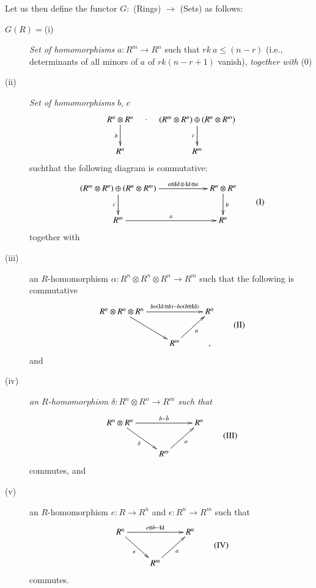 Let us then define the functor $G:$ (Rings) $\to$ (Sets) as follows:
\begin{description}
\item[$G(R)=${\rm(i)}] {\em Set of homomorphisms} $a:R^{m}\to R^{n}$
  such that $rk\ a\leq (n-r)$ (i.e., determinants of all minors of $a$
  of $rk(n-r+1)$ vanish), {\em together with} (0)

\item[{\rm(ii)}] {\em Set of homomorphisms} $b$, $c$
\[
\xymatrix{
R^{n}\otimes R^{n}\ar[d]_{b} \ar@{}[r]|-{,} & (R^{m}\otimes
R^{n})\oplus (R^{n}\otimes R^{m})\ar[d]_{c}\\
R^{n} & R^{m}
}
\]
such\pageoriginale that the following diagram is commutative:
\begin{equation*}
\vcenter{
\xymatrix@C=2cm{
(R^{m}\otimes R^{n})\oplus (R^{n}\otimes R^{m})\ar[d]_{c}
  \ar[r]^-{a\otimes \Id\oplus \Id\otimes a} & R^{n}\otimes
  R^{n}\ar[d]^{b}\\
R^{m}\ar[r]^-{a} & R^{n}
}}\tag{I}
\end{equation*}
together with

\item[{\rm(iii)}] an $R$-homomorphism $\alpha:R^{n}\otimes
  R^{n}\otimes R^{n}\to R^{m}$ such that the following is commutative
\begin{equation*}
\vcenter{
\xymatrix{
R^{n}\otimes R^{n}\otimes R^{n}\ar[dr]\ar[rr]^-{bo(\Id\otimes
  b)-bo(b\otimes \Id)} & & R^{n}\\
 & R^{m}\ar[ur]_-{a} &,
}}\tag{II}
\end{equation*}
and

\item[{\rm(iv)}] {\em an $R$-homomorphism $\delta:R^{n}\otimes
  R^{n}\to R^{m}$ such that}
\begin{equation*}
\vcenter{
\xymatrix{
R^{n}\otimes R^{n}\ar[dr]_{\delta}\ar[rr]^-{b-\tilde{b}} & & R^{n}\\
 & R^{m}\ar[ur]_-{a} &
}}\tag{III}
\end{equation*}
commutes, and

\item[{\rm(v)}] an $R$-homomorphism $e:R\to R^{n}$ and
  $\epsilon:R^{n}\to R^{m}$ such that
\begin{equation*}
\vcenter{
\xymatrix{
R^{n}\ar[dr]_{\epsilon}\ar[rr]^-{e\otimes b-\Id} & & R^{n}\\
 & R^{m}\ar[ur]_-{a} &
}}\tag{IV}
\end{equation*}
commutes.
\end{description}

